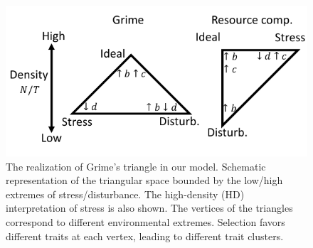 \documentclass[11pt]{article}
\begin{document}
\begin{figure}
\centering
\includegraphics[scale=1]{axes.pdf}
\caption{\label{fig:axes} The realization of Grime's triangle in our model. Schematic representation of the triangular space bounded by the low/high extremes of stress/disturbance. The high-density (HD) interpretation of stress is also shown. The vertices of the triangles correspond to different environmental extremes. Selection favors different traits at each vertex, leading to different trait clusters.} 
\end{figure}
\end{document}
